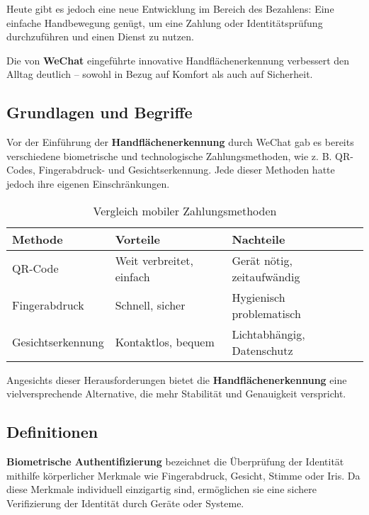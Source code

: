 \documentclass[paper=a4,fontsize=12pt,ngerman]{scrartcl}
\begin{document}
Heute gibt es jedoch eine neue Entwicklung im Bereich des Bezahlens: Eine 
einfache Handbewegung genügt, um eine Zahlung oder Identitätsprüfung 
durchzuführen und einen Dienst zu nutzen.

Die von \textbf{WeChat} eingeführte innovative Handflächenerkennung verbessert den 
Alltag deutlich – sowohl in Bezug auf Komfort als auch auf Sicherheit.


\subsection{Grundlagen und Begriffe}

Vor der Einführung der \textbf{Handflächenerkennung} durch WeChat gab es bereits 
verschiedene biometrische und technologische Zahlungsmethoden, wie z. B. QR-Codes, 
Fingerabdruck- und Gesichtserkennung. Jede dieser Methoden hatte jedoch ihre eigenen 
Einschränkungen.

\begin{table}[h]
\centering
\begin{tabular}{|l|p{5cm}|p{5cm}|}
\hline
\textbf{Methode} & \textbf{Vorteile} & \textbf{Nachteile} \\ 
\hline
QR-Code & Weit verbreitet, einfach & Gerät nötig, zeitaufwändig \\
\hline
Fingerabdruck & Schnell, sicher & Hygienisch problematisch \\
\hline
Gesichtserkennung & Kontaktlos, bequem & Lichtabhängig, Datenschutz \\
\hline
\end{tabular}
\caption{Vergleich mobiler Zahlungsmethoden}
\label{tab:zahlungsmethoden}
\end{table}

Angesichts dieser Herausforderungen bietet die \textbf{Handflächenerkennung} eine 
vielversprechende Alternative, die mehr Stabilität und Genauigkeit verspricht.

\subsection{Definitionen}
\textbf{Biometrische Authentifizierung} bezeichnet die Überprüfung der Identität mithilfe 
körperlicher Merkmale wie Fingerabdruck, Gesicht, Stimme oder Iris. Da diese Merkmale 
individuell einzigartig sind, ermöglichen sie eine sichere Verifizierung der Identität 
durch Geräte oder Systeme.
\end{document}
